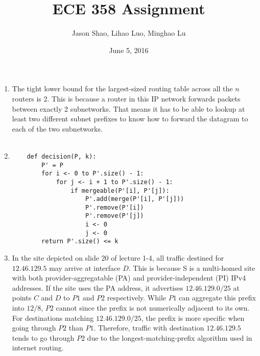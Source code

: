 \documentclass[12pt]{article}
\title{ECE 358 Assignment }
\author{Jason Shao, Lihao Luo, Minghao Lu}
\date{June 5, 2016}
\begin{document}
\maketitle
\renewcommand{\thesubsection}{Problem \arabic{subsection}}


\def\question#1{\item[\bf #1.]}
\def\part#1{\item[\bf #1)]}
\newcommand{\pc}[1]{\mbox{\textbf{#1}}} %

\begin{enumerate}
    \item The tight lower bound for the largest-sized routing table across all the $n$ routers is 2. This is because a router in this IP network forwards packets between exactly 2 subnetworks. That means it has to be able to lookup at least two different subnet prefixes to know how to forward the datagram to each of the two subnetworks. \\ \\
    \item 
    \begin{verbatim}
    def decision(P, k):
        P' = P
        for i <- 0 to P'.size() - 1:
            for j <- i + 1 to P'.size() - 1:
                if mergeable(P'[i], P'[j]):
                    P'.add(merge(P'[i], P'[j]))
                    P'.remove(P'[i])
                    P'.remove(P'[j])
                    i <- 0
                    j <- 0
        return P'.size() <= k    					
    \end{verbatim}
  
	\item In the site depicted on slide 20 of lecture 1-4, all traffic destined for $12.46.129.5$ may arrive at interface $D$. This is because S is a multi-homed site with both provider-aggregatable (PA) and provider-independent (PI) IPv4 addresses. If the site uses the PA address, it advertises $12.46.129.0/25$ at points $C$ and $D$ to $P1$ and $P2$ respectively. While $P1$ can aggregate this prefix into $12/8$, $P2$ cannot since the prefix is not numerically adjacent to its own. For destinations matching $12.46.129.0/25$, the prefix is more specific when going through $P2$ than $P1$. Therefore, traffic with destination $12.46.129.5$ tends to go through $P2$ due to the longest-matching-prefix algorithm used in internet routing. \\
	

\end{enumerate}
\end{document}
